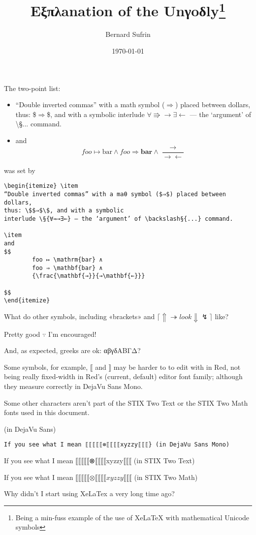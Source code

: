 \documentclass[11pt,a4paper]{article}
\author{Bernard Sufrin}
\title{Eξπλanation of the Unγoδly\footnote{Being a min-fuss example of the use of
XeLaTeX
with mathematical Unicode symbols}}
\date{\today}
\def\§#1{\symbolfamily{#1}}
\def\§#1{${#1}$}
\begin{document}
\maketitle

The two-point list:

\begin{itemize} \item
“Double inverted commas” with a math symbol ($⇒$) placed between dollars,
thus: \$$⇒$\$, and with a symbolic
interlude \§{∀⇛→∃←} — the ‘argument’ of \backslash§{...} command.

\item
and 
$$
        foo ↦ \mathrm{bar} ∧
        foo ⇒ \mathbf{bar} ∧
        {\frac{\mathbf{→}}{→\mathbf{←}}}
$$
\end{itemize}
was set by
\begin{verbatim}
\begin{itemize} \item
“Double inverted commas” with a maθ symbol ($⇒$) placed between dollars,
thus: \$$⇒$\$, and with a symbolic
interlude \§{∀⇛→∃←} — the ‘argument’ of \backslash§{...} command.

\item
and 
$$
        foo ↦ \mathrm{bar} ∧
        foo ⇒ \mathbf{bar} ∧
        {\frac{\mathbf{→}}{→\mathbf{←}}}

$$
\end{itemize}
\end{verbatim}
What do other symbols, including «brackets» and  $ ⌈⇑ ↠ look ⇓  ↯ ⌉$ like?


Pretty good $∵$ I'm encouraged!

And, as expected, greeks are ok:  αβγδΑΒΓΔ?

Some symbols, for example, $⟦$ and $⟧$ may be harder to
to edit with in Red, not being really fixed-width in
Red's (current, default) editor
font family; although they measure correctly in
DejaVu Sans Mono.

Some other characters aren't part of the STIX Two Text
or the STIX Two Math fonts used in this document.

\bgroup{} (in DejaVu Sans)\egroup

\verb/If you see what I mean ⟦⟦⟦⟦⟦⊗⟦⟦⟦⟦xyzzy⟦⟦⟦} (in DejaVu Sans Mono)/

If you see what I mean ⟦⟦⟦⟦⟦⊗⟦⟦⟦⟦xyzzy⟦⟦⟦ (in STIX Two Text)

If you see what I mean $⟦⟦⟦⟦⟦⊗⟦⟦⟦⟦xyzzy⟦⟦⟦$ (in STIX Two Math)




Why didn't I start using XeLaTex a very long time ago?
\end{document}
